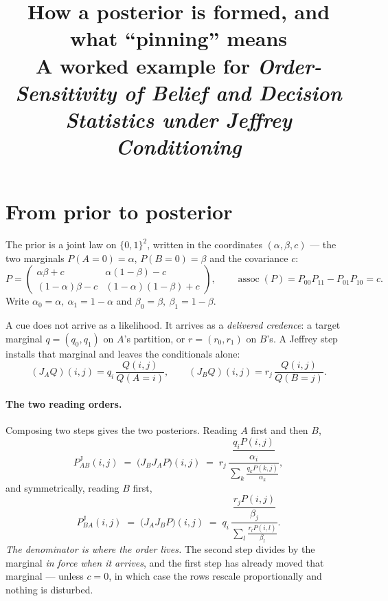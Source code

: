 \documentclass[11pt,a4paper]{article}
\title{How a posterior is formed, and what ``pinning'' means\\
\large A worked example for \emph{Order-Sensitivity of Belief and Decision
Statistics under Jeffrey Conditioning}}
\author{}
\date{}
\newcommand{\PJ}{P^{\mathrm{J}}}
\newcommand{\assoc}{\operatorname{assoc}}
\theoremstyle{definition}
\theoremstyle{plain}
\theoremstyle{remark}
\begin{document}
\maketitle
\vspace{-2.2em}

\section{From prior to posterior}

The prior is a joint law on $\{0,1\}^{2}$, written in the coordinates
$(\alpha,\beta,c)$ --- the two marginals $P(A{=}0)=\alpha$, $P(B{=}0)=\beta$ and
the covariance $c$:
\begin{equation}
  P=\begin{pmatrix}\alpha\beta+c & \alpha(1-\beta)-c\\[2pt]
                   (1-\alpha)\beta-c & (1-\alpha)(1-\beta)+c\end{pmatrix},
  \qquad \assoc(P)=P_{00}P_{11}-P_{01}P_{10}=c .
  \label{eq:prior}
\end{equation}
Write $\alpha_{0}=\alpha,\ \alpha_{1}=1-\alpha$ and $\beta_{0}=\beta,\
\beta_{1}=1-\beta$.

A cue does not arrive as a likelihood. It arrives as a \emph{delivered
credence}: a target marginal $q=(q_{0},q_{1})$ on $A$'s partition, or
$r=(r_{0},r_{1})$ on $B$'s. A Jeffrey step installs that marginal and leaves
the conditionals alone:
\begin{equation}
  (J_{A}Q)(i,j)=q_{i}\,\frac{Q(i,j)}{Q(A{=}i)},
  \qquad
  (J_{B}Q)(i,j)=r_{j}\,\frac{Q(i,j)}{Q(B{=}j)} .
  \label{eq:step}
\end{equation}

\paragraph{The two reading orders.}
Composing two steps gives the two posteriors. Reading $A$ first and then $B$,
\begin{equation}
  \PJ_{AB}(i,j)
  \;=\;\bigl(J_{B}J_{A}P\bigr)(i,j)
  \;=\;r_{j}\,
    \frac{\dfrac{q_{i}P(i,j)}{\alpha_{i}}}
         {\displaystyle\sum_{k}\frac{q_{k}P(k,j)}{\alpha_{k}}},
  \label{eq:ab}
\end{equation}
and symmetrically, reading $B$ first,
\begin{equation}
  \PJ_{BA}(i,j)
  \;=\;\bigl(J_{A}J_{B}P\bigr)(i,j)
  \;=\;q_{i}\,
    \frac{\dfrac{r_{j}P(i,j)}{\beta_{j}}}
         {\displaystyle\sum_{l}\frac{r_{l}P(i,l)}{\beta_{l}}} .
  \label{eq:ba}
\end{equation}
\emph{The denominator is where the order lives.} The second step divides by the
marginal \emph{in force when it arrives}, and the first step has already moved
that marginal --- unless $c=0$, in which case the rows rescale proportionally
and nothing is disturbed.
\end{document}
